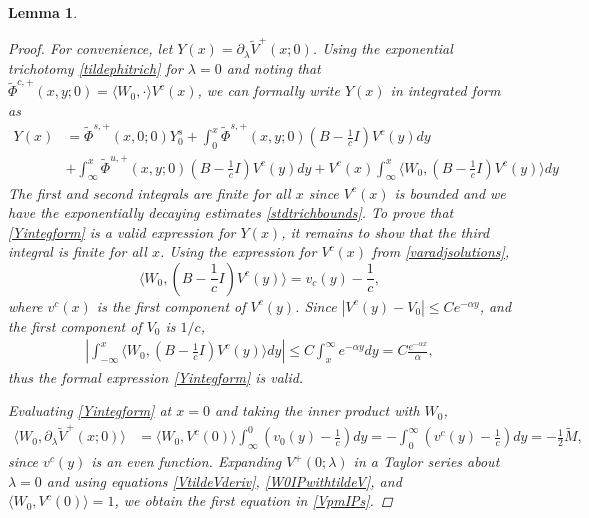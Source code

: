\documentclass[10pt,reqno]{amsart}
\theoremstyle{plain}
\newtheorem{lemma}[theorem]{Lemma}
\theoremstyle{definition}
\theoremstyle{remark}
\numberwithin{theorem}{section}
\numberwithin{equation}{section}
\begin{document}
\begin{lemma}
\begin{proof}
For convenience, let $Y(x) = \partial_\lambda \tilde{V}^+(x; 0)$. Using the exponential trichotomy \cref{tildephitrich} for $\lambda = 0$ and noting that $\tilde{\Phi}^{c,+}(x, y; 0) = \langle W_0, \cdot \rangle V^c(x)$, we can formally write $Y(x)$ in integrated form as
\begin{equation}\label{Yintegform}
\begin{aligned}
Y(x) &= \tilde{\Phi}^{s,+}(x,0; 0)Y_0^s 
+ \int_0^x \tilde{\Phi}^{s,+}(x,y; 0)\left( B - \frac{1}{c}I \right) V^c(y) dy \\
&+ \int_{\infty}^x \tilde{\Phi}^{u,+}(x,y; 0)\left( B - \frac{1}{c}I \right) V^c(y) dy + V^c(x) \int_{\infty}^x \langle W_0, \left( B - \frac{1}{c}I \right) V^c(y) \rangle dy 
\end{aligned}
\end{equation}
The first and second integrals are finite for all $x$ since $V^c(x)$ is bounded and we have the exponentially decaying estimates \cref{stdtrichbounds}. To prove that \cref{Yintegform} is a valid expression for $Y(x)$, it remains to show that the third integral is finite for all $x$. Using the expression for $V^c(x)$ from \cref{varadjsolutions}, 
\[
\langle W_0, \left( B - \frac{1}{c}I \right) V^c(y) \rangle = v_c(y) - \frac{1}{c},
\]
where $v^c(x)$ is the first component of $V^c(y)$. Since $|V^c(y) - V_0|\leq C e^{-\alpha y}$, and the first component of $V_0$ is $1/c$, 
\begin{align*}
\left| \int_{-\infty}^x \langle W_0, \left( B - \frac{1}{c}I \right) V^c(y) \rangle dy \right| 
\leq C \int_x^{\infty} e^{-\alpha y} dy = C \frac{e^{-\alpha x}}{\alpha},
\end{align*}
thus the formal expression \cref{Yintegform} is valid. 

Evaluating \cref{Yintegform} at $x = 0$ and taking the inner product with $W_0$, 
\begin{align}\label{W0IPwithtildeV}
\langle W_0, \partial_\lambda \tilde{V}^+(x; 0) \rangle
&= \langle W_0, V^c(0) \rangle \int_{\infty}^0 \left(v_0(y) - \frac{1}{c}\right) dy 
= -\int_0^{\infty} \left(v^c(y) - \frac{1}{c}\right) dy = -\frac{1}{2} \tilde{M},
\end{align}
since $v^c(y)$ is an even function. Expanding $V^+(0; \lambda)$ in a Taylor series about $\lambda = 0$ and using equations \cref{VtildeVderiv}, \cref{W0IPwithtildeV}, and $\langle W_0, V^c(0)\rangle = 1$, we obtain the first equation in \cref{VpmIPs}.


\end{proof}
\end{lemma}
\end{document}
